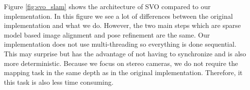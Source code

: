 \documentclass[11pt,a4paper,titlepage,oneside]{report}
\begin{document}
Figure \ref{fig:svo_slam} shows the architecture of SVO compared to our implementation. In this figure we see a lot of differences between the original implementation and what we do. However, the two main steps which are sparse model based image alignment and pose refinement are the same. Our implementation does not use multi-threading so everything is done sequential. This may surprise but has the advantage of not having to synchronize and is also more deterministic. Because we focus on stereo cameras, we do not require the mapping task in the same depth as in the original implementation. Therefore, it this task is also less time consuming. 

\begin{figure}[H]
  \centering
	\qquad

\end{figure}
\end{document}
